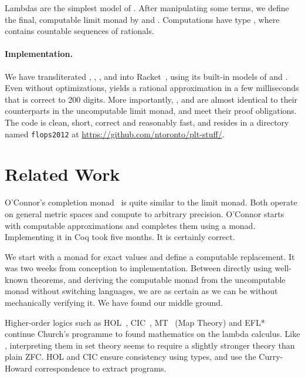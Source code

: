 Lambdas are the simplest model of \tlzfc{\lnat \to \metricuniv}. After manipulating some terms, we define the final, computable limit monad by  and . Computations have type , where  contains countable sequences of rationals.

\paragraph{Implementation.}
We have transliterated , , ,  and  into Racket~\cite{cit:racket-lang}, using its built-in models of \tlzfc{\lnat} and \tlzfc{\Rat}. Even without optimizations,  yields a rational approximation in a few milliseconds that is correct to 200 digits. More importantly, ,  and  are almost identical to their counterparts in the uncomputable limit monad, and meet their proof obligations. The code is clean, short, correct and reasonably fast, and resides in a directory named \texttt{flops2012} at \url{https://github.com/ntoronto/plt-stuff/}.


\section{Related Work}

O'Connor's completion monad~\cite{cit:oconnor-2008-real-numbers} is quite similar to the limit monad. Both operate on general metric spaces and compute to arbitrary precision. O'Connor starts with computable approximations and completes them using a monad. Implementing it in Coq took five months. It is certainly correct.

We start with a monad for exact values and define a computable replacement. It was two weeks from conception to implementation. Between directly using well-known theorems, and deriving the computable monad from the uncomputable monad without switching languages, we are as certain as we can be without mechanically verifying it. We have found our middle ground.

Higher-order logics such as HOL~\cite{leivant-1994-hol}, CIC~\cite{cit:book-coqart}, MT~\cite{cit:berline-1997-mt} (Map Theory) and EFL*~\cite{cit:myhill-1989-efl} continue Church's programme to found mathematics on the lambda calculus. Like \targetlang, interpreting them in set theory seems to require a slightly stronger theory than plain ZFC. HOL and CIC ensure consistency using types, and use the Curry-Howard correspondence to extract programs.

